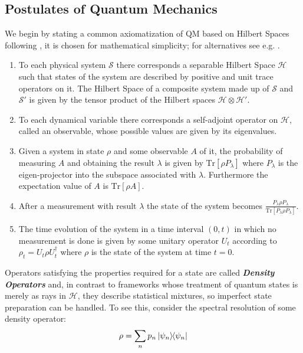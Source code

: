 \subsection{Postulates of Quantum Mechanics}
We begin by stating a common axiomatization of QM based on Hilbert Spaces following \cite{ballentine_quantum_2014}, it is chosen for mathematical simplicity; for alternatives see e.g. \cite{reyes-lega_aspects_2015}.
\begin{enumerate}
        \item To each physical system $\mathcal{S}$ there corresponds a separable Hilbert Space $\mathcal{H}$ such that states of the system are described by positive and unit trace operators on it. The Hilbert Space of a composite system made up of $\mathcal{S}$ and $\mathcal{S}'$
        is given by the tensor product of the Hilbert spaces $\mathcal{H}\otimes\mathcal{H}'$.
        \item To each dynamical variable there corresponds a self-adjoint operator on $\mathcal{H}$, called an observable, whose possible
        values are given by its eigenvalues.
        \item Given a system in  state $\rho$ and some observable $A$ of it, the probability of measuring $A$ and obtaining the result
        $\lambda$ is given by $\mathrm{Tr}[\rho P_{\lambda}]$ where $P_{\lambda}$ is the eigen-projector into the subspace associated with
        $\lambda$. Furthermore the expectation value of $A$ is $\mathrm{Tr}[\rho A]$.
        \item After a measurement with result $\lambda$ the state of the system becomes $\frac{P_{\lambda}\rho P_{\lambda}}{\mathrm{Tr}[P_{\lambda}\rho
        P_{\lambda}]}$.
        \item The time evolution of the system in a time interval $(0,t)$ in which no measurement is done is given by some unitary operator
        $U_{t}$ according to $\rho_{t}=U_{t}\rho U_{t}^{\dagger}$ where $\rho$ is the state of the system at time $t=0$.
\end{enumerate}
Operators satisfying the properties required for a state are called \textit{\textbf{Density Operators}} and, in contrast to frameworks
whose treatment of quantum states is merely as rays in $\mathcal{H}$, they describe statistical mixtures, so imperfect state preparation
can be handled. To see this, consider the spectral resolution of some density operator:
\begin{equation}
  \rho = \sum_{n}p_{n}\ketbra{\psi_{n}}
\end{equation}
